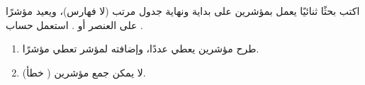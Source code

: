 \begin{statement}
اكتب بحثًا ثنائيًا  يعمل بمؤشرين على بداية ونهاية جدول مرتب (لا فهارس)، ويعيد مؤشرًا على العنصر أو . استعمل حساب .
\end{statement}
\begin{stepsbox}\begin{enumerate}
\item طرح مؤشرين يعطي عددًا، وإضافته لمؤشر تعطي مؤشرًا.
\item لا يمكن جمع مؤشرين ( خطأ).
\end{enumerate}\end{stepsbox}
